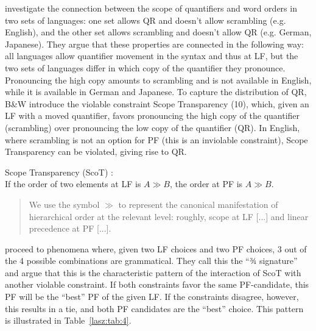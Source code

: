 \documentclass[output=paper,colorlinks,citecolor=brown,
]{langscibook}
\begin{document}
\citet{Bobaljik.Wurmbrand.2012} investigate the connection between the
scope of quantifiers and word orders in two sets of languages: one set
allows QR and doesn’t allow scrambling (e.g. English), and the other
set allows scrambling and doesn’t allow QR (e.g. German, Japanese).
They argue that these properties are connected in the following way:
all languages allow quantifier movement in the syntax and thus at LF,
but the two sets of languages differ in which copy of the quantifier
they pronounce. Pronouncing the high copy amounts to scrambling
and is not available in English, while it is available in German and
Japanese. To capture the distribution of QR, B\&W introduce the
violable constraint Scope Transparency (10), which, given an LF with
a moved quantifier, favors pronouncing the high copy of the quantifier
(scrambling) over pronouncing the low copy of the quantifier (QR). In
English, where scrambling is not an option for PF (this is an inviolable
constraint), Scope Transparency can be violated, giving rise to QR.

\ea
    Scope Transparency (ScoT) \citep[]{Bobaljik.Wurmbrand.2012}: \\
    If the order of two elements at LF is $A\gg B$, the order at PF is $A\gg B$. \\
    \begin{quote}
    We use the symbol $\gg$ to represent the canonical manifestation
    of hierarchical order at the relevant level: roughly, scope at LF
    [...] and linear precedence at PF [...]. 
    \end{quote}
\z 

\citet{Bobaljik.Wurmbrand.2012} proceed to phenomena where, given
two LF choices and two PF choices, 3 out of the 4 possible
combinations are grammatical. They call this the “3⁄4 signature” and
argue that this is the characteristic pattern of the interaction of ScoT
with another violable constraint. If both constraints favor the same
PF-candidate, this PF will be the “best” PF of the given LF. If the
constraints disagree, however, this results in a tie, and both PF
candidates are the “best” choice. This pattern is illustrated in Table~\ref{lasz:tab:4}.

\newcommand{\laszTabRowA}[0]{}
\newcommand{\laszTabRowB}[0]{}
\end{document}
